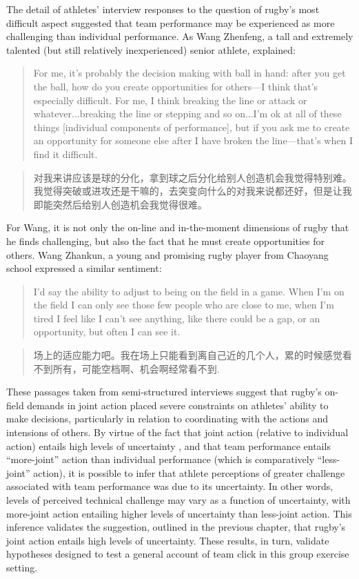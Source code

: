 \begin{CJK}{UTF8}{gbsn}
The detail of athletes' interview responses to the question of rugby's most difficult aspect suggested that team performance may be experienced as more challenging than individual performance.  As Wang Zhenfeng, a tall and extremely talented (but still relatively inexperienced) senior athlete, explained:
            \begin{quote}
            For me, it's probably the decision making with ball in hand: after you get the ball, how do you create opportunities for others---I think that's especially difficult.  For me, I think breaking the line or attack or whatever...breaking the line or stepping and so on...I'm ok at all of these things [individual components of performance], but if you ask me to create an opportunity for someone else after I have broken the line---that's when I find it difficult.
            \end{quote}
            \begin{quote}
            对我来讲应该是球的分化，拿到球之后分化给别人创造机会我觉得特别难。我觉得突破或进攻还是干嘛的，去突变向什么的对我来说都还好，但是让我即能突然后给别人创造机会我觉得很难。
            \end{quote}
For Wang, it is not only the on-line and in-the-moment dimensions of rugby that he finds challenging, but also the fact that he must create opportunities for others.  Wang Zhankun, a young and promising rugby player from Chaoyang school expressed a similar sentiment:
          \begin{quote}
          I'd say the ability to adjust to being on the field in a game.  When I'm on the field I can only see those few people who are close to me, when I'm tired I feel like I can't see anything, like there could be a gap, or an opportunity, but often I can see it.
          \end{quote}
          \begin{quote}
          场上的适应能力吧。我在场上只能看到离自己近的几个人，累的时候感觉看不到所有，可能空档啊、机会啊经常看不到.
          \end{quote}

These passages taken from semi-structured interviews suggest that rugby's on-field demands in joint action placed severe constraints on athletes' ability to make decisions, particularly in relation to coordinating with the actions and intensions of others.  By virtue of the fact that joint action (relative to individual action) entails high levels of uncertainty \citep{Turvey1978}, and that team performance entails ``more-joint'' action than individual performance (which is comparatively ``less-joint'' action), it is possible to infer that athlete perceptions of greater challenge associated with team performance was due to its uncertainty.  In other words, levels of perceived technical challenge may vary as a function of uncertainty, with more-joint action entailing higher levels of uncertainty than less-joint action.  This inference validates the suggestion, outlined in the previous chapter, that rugby's joint action entails high levels of uncertainty.  These results, in turn, validate hypotheses designed to test a general account of team click in this group exercise setting.


\end{CJK}
